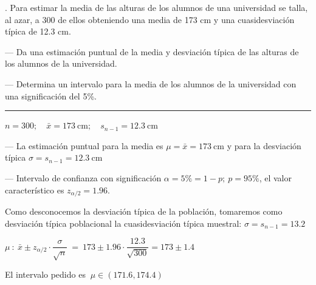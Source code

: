 \vspace{4mm} %
\begin{example}
.	Para estimar la media de las alturas de los alumnos de una universidad se talla, al azar, a 300 de ellos obteniendo una media de 173 cm y una cuasidesviación típica de 12.3 cm.

\vspace{2mm}--- Da una estimación puntual de la media y desviación típica de las alturas de los alumnos de la universidad.

\vspace{2mm}--- Determina un intervalo para la media de los alumnos de la universidad con una significación del 5\%. 	

\rule{150pt}{0.1pt}

\vspace{2mm} $n=300; \quad \bar x=173 \ \mathrm{cm};\quad s_{n-1}=12.3\ \mathrm{cm}$

\vspace{2mm} --- La estimación puntual para la media es $\mu=\bar x=173 \ \mathrm{cm}$ y para la desviación típica $\sigma=s_{n-1}=12.3 \  \mathrm{cm}$

\vspace{2mm} --- Intervalo de confianza con significación $\alpha=5\%=1-p;\ p=95\%$, el valor característico es $z_{\alpha/2}=1.96$. 

\vspace{2mm} Como desconocemos la desviación típica de la población, tomaremos como desviación típica poblacional la cuasidesviación típica muestral: $\sigma=s_{n-1}=13.2$

\vspace{2mm} $\mu \ : \ 
\bar x \pm z_{\alpha/2} \cdot \dfrac{\sigma}{\sqrt{n}} \ =\ 
173\pm 1.96\cdot \dfrac{12.3}{\sqrt{300}}=173\pm 1.4$

\vspace{2mm} El intervalo pedido es $\ \mu \in (171.6,174.4)$
\end{example}

